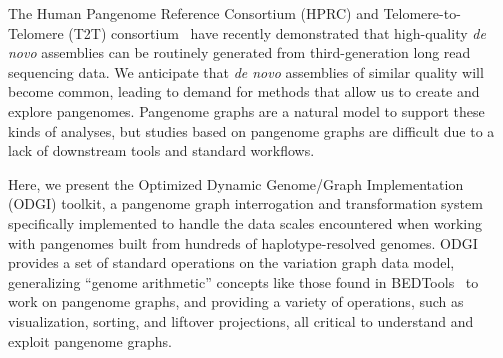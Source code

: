 \documentclass{bioinfo}
\begin{document}
The Human Pangenome Reference Consortium (HPRC) and Telomere-to-Telomere (T2T) consortium~\citep{Miga:2020, Logsdon_2021, Nurk_2021} have recently demonstrated that high-quality \textit{de novo} assemblies can be routinely generated from third-generation long read sequencing data.
We anticipate that \textit{de novo} assemblies of similar quality will become common, leading to demand for methods that allow us to create and explore pangenomes.
Pangenome graphs are a natural model to support these kinds of analyses, but studies based on pangenome graphs are difficult due to a lack of downstream tools and standard workflows.

Here, we present the Optimized Dynamic Genome/Graph Implementation (ODGI) toolkit, a pangenome graph interrogation and transformation system specifically implemented to handle the data scales encountered when working with pangenomes built from hundreds of haplotype-resolved genomes.
ODGI provides a set of standard operations on the variation graph data model, generalizing ``genome arithmetic'' concepts like those found in BEDTools~\citep{Quinlan_2010} to work on pangenome graphs,
and providing a variety of operations, such as visualization, sorting, and liftover projections, all critical to understand and exploit pangenome graphs.


\end{document}
